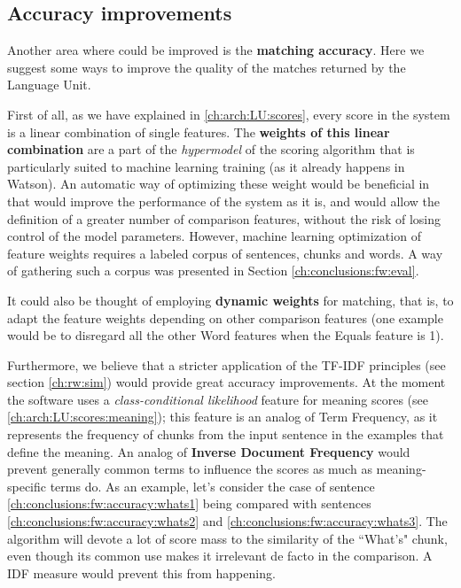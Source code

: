 \subsection{Accuracy improvements} \label{ch:conclusions:fw:accuracy}
Another area where \pname could be improved is the \textbf{matching accuracy}. Here we suggest some ways to improve the quality of the matches returned by the Language Unit.

First of all, as we have explained in \ref{ch:arch:LU:scores}, every score in the system is a linear combination of single features. The \textbf{weights of this linear combination} are a part of the \textit{hypermodel} of the scoring algorithm that is particularly suited to machine learning training (as it already happens in Watson). An automatic way of optimizing these weight would be beneficial in that would improve the performance of the system as it is, and would allow the definition of a greater number of comparison features, without the risk of losing control of the model parameters. However, machine learning optimization of feature weights requires a labeled corpus of sentences, chunks and words. A way of gathering such a corpus was presented in Section \ref{ch:conclusions:fw:eval}.

It could also be thought of employing \textbf{dynamic weights} for matching, that is, to adapt the feature weights depending on other comparison features (one example would be to disregard all the other Word features when the Equals feature is 1).

Furthermore, we believe that a stricter application of the TF-IDF principles (see section \ref{ch:rw:sim}) would provide great accuracy improvements. At the moment the software uses a \textit{class-conditional likelihood} feature for meaning scores (see \ref{ch:arch:LU:scores:meaning}); this feature is an analog of Term Frequency, as it represents the frequency of chunks from the input sentence in the examples that define the meaning. An analog of \textbf{Inverse Document Frequency} would prevent generally common terms to influence the scores as much as meaning-specific terms do. As an example, let's consider the case of sentence \ref{ch:conclusions:fw:accuracy:whats1} being compared with sentences \ref{ch:conclusions:fw:accuracy:whats2} and \ref{ch:conclusions:fw:accuracy:whats3}. The algorithm will devote a lot of score mass to the similarity of the ``What's" chunk, even though its common use makes it irrelevant de facto in the comparison. A IDF measure would prevent this from happening.
 \label{ch:conclusions:fw:accuracy:whats1}
\vspace{-0.7cm}
 \label{ch:conclusions:fw:accuracy:whats2}
\vspace{-0.7cm}
 \label{ch:conclusions:fw:accuracy:whats3}


